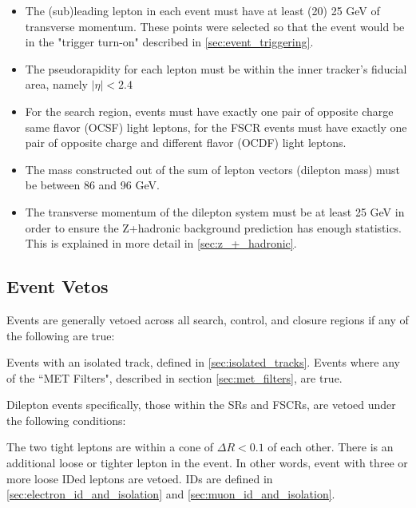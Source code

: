     \begin{itemize}
      \item The (sub)leading lepton in each event must have at least (20) 25 GeV of transverse momentum. These points were selected so that the event would be in the "trigger turn-on" described in \ref{sec:event_triggering}.
      \item The pseudorapidity for each lepton must be within the inner tracker's fiducial area, namely $\left|\eta\right| < 2.4$
      \item For the search region, events must have exactly one pair of opposite charge same flavor (OCSF) light leptons, for the FSCR events must have exactly one pair of opposite charge and different flavor (OCDF) light leptons.
      \item The mass constructed out of the sum of lepton vectors (dilepton mass) must be between 86 and 96 GeV.
      \item The transverse momentum of the dilepton system must be at least 25 GeV in order to ensure the Z+hadronic background prediction has enough statistics. This is explained in more detail in \ref{sec:z_+_hadronic}.
    \end{itemize}

  \subsection{Event Vetos}
    Events are generally vetoed across all search, control, and closure regions if any of the following are true:

    \begin{description}
       Events with an isolated track, defined in \ref{sec:isolated_tracks}.
       Events where any of the ``MET Filters", described in section \ref{sec:met_filters}, are true.
    \end{description}

    Dilepton events specifically, those within the SRs and FSCRs, are vetoed under the following conditions:

      \begin{description}
         The two tight leptons are within a cone of $\Delta R < 0.1$ of each other.
         There is an additional loose or tighter lepton in the event. In other words, event with three or more loose IDed leptons are vetoed. IDs are defined in \ref{sec:electron_id_and_isolation} and \ref{sec:muon_id_and_isolation}. 
      \end{description}

